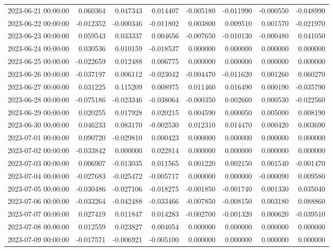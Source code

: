 \begin{tabular}{lrrrrrrr}
2023-06-21 00:00:00 & 0.060364 & 0.047343 & 0.014407 & -0.005180 & -0.011990 & -0.000550 & -0.048990 \\
2023-06-22 00:00:00 & -0.012352 & -0.000346 & -0.011802 & 0.003800 & 0.009510 & 0.001570 & -0.021970 \\
2023-06-23 00:00:00 & 0.059543 & 0.033337 & 0.004656 & -0.007650 & -0.010130 & -0.000480 & 0.041050 \\
2023-06-24 00:00:00 & 0.030536 & 0.010159 & -0.018537 & 0.000000 & 0.000000 & 0.000000 & 0.000000 \\
2023-06-25 00:00:00 & -0.022659 & 0.012488 & 0.006775 & 0.000000 & 0.000000 & 0.000000 & 0.000000 \\
2023-06-26 00:00:00 & -0.037197 & 0.006112 & -0.023042 & -0.004470 & -0.011620 & 0.001260 & 0.060270 \\
2023-06-27 00:00:00 & 0.031225 & 0.115209 & 0.008975 & 0.011460 & 0.016490 & 0.000190 & -0.035790 \\
2023-06-28 00:00:00 & -0.075186 & -0.023346 & -0.038064 & -0.000350 & 0.002660 & 0.000530 & -0.022560 \\
2023-06-29 00:00:00 & 0.020255 & 0.017928 & 0.020215 & 0.004590 & 0.000050 & 0.005000 & 0.008190 \\
2023-06-30 00:00:00 & 0.046233 & 0.083170 & -0.002530 & 0.012310 & 0.014470 & 0.000420 & 0.003690 \\
2023-07-01 00:00:00 & 0.090720 & -0.029810 & 0.000423 & 0.000000 & 0.000000 & 0.000000 & 0.000000 \\
2023-07-02 00:00:00 & -0.033842 & 0.000000 & 0.022814 & 0.000000 & 0.000000 & 0.000000 & 0.000000 \\
2023-07-03 00:00:00 & 0.006907 & -0.013035 & 0.011565 & 0.001220 & 0.002150 & 0.001540 & -0.001470 \\
2023-07-04 00:00:00 & -0.027683 & -0.025472 & -0.005717 & 0.000000 & 0.000000 & -0.000090 & 0.009580 \\
2023-07-05 00:00:00 & -0.030486 & -0.027106 & -0.018275 & -0.001850 & -0.001740 & 0.001330 & 0.035040 \\
2023-07-06 00:00:00 & -0.033264 & -0.042488 & -0.033466 & -0.007850 & -0.008150 & 0.003180 & 0.088860 \\
2023-07-07 00:00:00 & 0.027419 & 0.011847 & 0.014283 & -0.002700 & -0.001320 & 0.000620 & -0.039510 \\
2023-07-08 00:00:00 & 0.012559 & 0.023827 & 0.004054 & 0.000000 & 0.000000 & 0.000000 & 0.000000 \\
2023-07-09 00:00:00 & -0.017571 & -0.006921 & -0.005100 & 0.000000 & 0.000000 & 0.000000 & 0.000000 \\

\end{tabular}
